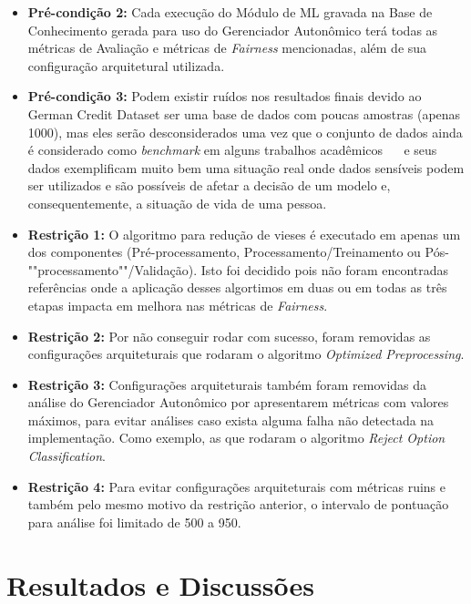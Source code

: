 \documentclass[portugues]{ic-tese}
\begin{document}
\begin{itemize}
\item \textbf{Pré-condição 2:} Cada execução do Módulo de ML gravada na Base de Conhecimento gerada para uso do Gerenciador Autonômico terá todas as métricas de Avaliação e métricas de \textit{Fairness} mencionadas, além de sua configuração arquitetural utilizada.

\item \textbf{Pré-condição 3:} Podem existir ruídos nos resultados finais devido ao German Credit Dataset ser uma base de dados com poucas amostras (apenas 1000), mas eles serão desconsiderados uma vez que o conjunto de dados ainda é considerado como \textit{benchmark} em alguns trabalhos acadêmicos \citep{Kamiran_2011}~\citep{Feldman_2015}~\citep{Celis_2019} e seus dados exemplificam muito bem uma situação real onde dados sensíveis podem ser utilizados e são possíveis de afetar a decisão de um modelo e, consequentemente, a situação de vida de uma pessoa.

\item \textbf{Restrição 1:} O algoritmo para redução de vieses é executado em apenas um dos componentes (Pré-processamento, Processamento/Treinamento ou Pós-""processamento""/Validação). Isto foi decidido pois não foram encontradas referências onde a aplicação desses algortimos em duas ou em todas as três etapas impacta em melhora nas métricas de \textit{Fairness}.

\item \textbf{Restrição 2:} Por não conseguir rodar com sucesso, foram removidas as configurações arquiteturais que rodaram o algoritmo \textit{Optimized Preprocessing}.

\item \textbf{Restrição 3:} Configurações arquiteturais também foram removidas da análise do Gerenciador Autonômico por apresentarem métricas com valores máximos, para evitar análises caso exista alguma falha não detectada na implementação. Como exemplo, as que rodaram o algoritmo \textit{Reject Option Classification}.

\item \textbf{Restrição 4:} Para evitar configurações arquiteturais com métricas ruins e também pelo mesmo motivo da restrição anterior, o intervalo de pontuação para análise foi limitado de 500 a 950.
\end{itemize}

\section{Resultados e Discussões}
\end{document}
